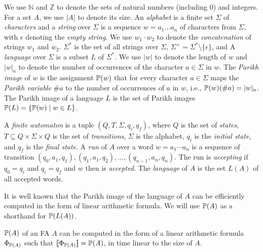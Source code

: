 \documentclass[sigplan,review,anonymous]{acmart}\settopmatter{printfolios=true,printccs=false,printacmref=false}
\begin{document}
We use $\mathbb{N}$ and $\mathbb{Z}$ to denote the sets of natural numbers (including 0) and 
integers. For a set $A$, we use $|A|$ to denote its size. 
An \emph{alphabet} is a finite set $\Sigma$ of \emph{characters} and a \emph{string} over $\Sigma$ is a sequence $w = a_1\ldots a_n$ of characters from $\Sigma$, with $\epsilon$ denoting the \emph{empty string}. 
We use $w_1\cdot w_2$ to denote the \emph{concatenation} of strings $w_1$ and $w_2$.
$\Sigma^*$ is the set of all strings over $\Sigma$, $\Sigma^+ = \Sigma^*\setminus \{\epsilon\}$, and 
A \emph{language} over $\Sigma$ is a subset $L$ of $\Sigma^*$.  
%
We use $|w|$ to denote the length of $w$ and $|w|_a$ to denote the number of occurrences of the character $a\in \Sigma$ in $w$.  
The \emph{Parikh image} of $w$ is the assignment 
$\mathbb{P}{(w)}$ that for every character $a\in\Sigma$ maps the \emph{Parikh variable} $\#a$ to the number of occurrences of $a$ in $w$, i.e., $\mathbb{P}{(w)} (\#a) = |w|_a$. 
The Parikh image of a language $L$ is the set of Parikh images $\mathbb{P}{(L)} = \{\mathbb{P}{(w)} \mid w \in  L\}$. 

A \emph{finite automaton} is a tuple $(Q,T,\Sigma,q_i,q_f)$, where $Q$ is the set of \emph{states}, $T\subseteq Q\times \Sigma \times Q $ is the set of \emph{transitions}, $\Sigma$ is the alphabet, $q_i$ is the \emph{initial state}, and $q_f$ is the \emph{final state}. 
A \emph{run} of $A$ over a word $w = a_1\cdots a_n$ is a sequence of transition $(q_0,a_1,q_1),(q_1,a_1,q_2),\ldots,(q_{n-1},a_n,q_n)$. The run  is \emph{accepting} if $q_0 = q_i$ and $q_i = q_f$ and $w$ then is \emph{accepted}.
The \emph{language} of $A$ is the set $L(A)$ of all accepted words.

It is well known that the Parikh image of the language of $A$ can be efficiently computed in the form of linear arithmetic formula.
We will use $\mathbb{P}{(A)}$ as a shorthand for $\mathbb{P}{(L(A))}$.

\begin{lemma}
$\mathbb{P}{(A)}$ of an FA $A$ can be computed in the form of a linear arithmetic formula  $\Phi_{\mathbb{P}{(A)}}$ such that $[\![\Phi_{\mathbb{P}{(A)}}]\!] = \mathbb{P}{(A)}$, in time linear to the size of $A$.
\end{lemma}



 
\end{document}
